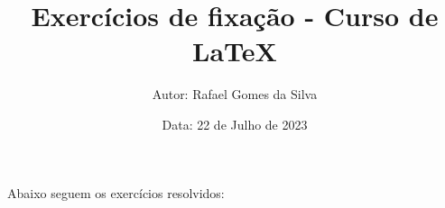 \documentclass{article}
\title{\textbf{Exercícios de fixação - Curso de LaTeX}}
\author{Autor: Rafael Gomes da Silva}
\date{Data: 22 de Julho de 2023}
\begin{document}
\maketitle

Abaixo seguem os exercícios resolvidos:
\end{document}
